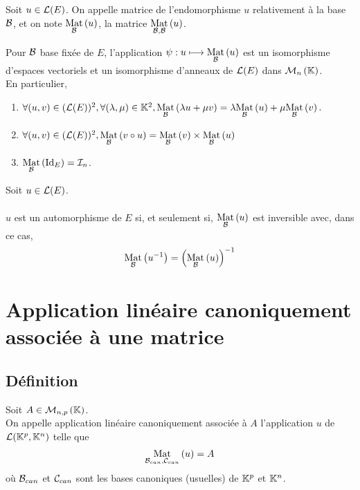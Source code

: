 \begin{defi}
    Soit \(u \in \cal{L}(E)\).
    On appelle matrice de l’endomorphisme \(u\) relativement à la base \(\cal{B}\), et on note \(\Mat{\cal{B}}{u}\), la matrice \(\Mat{\cal{B}, \cal{B}}{u}\).  
\end{defi}

\begin{prop}
    Pour \(\cal{B}\) base fixée de \(E\), l’application \(\psi : u \mapsto \Mat{\cal{B}}{u}\) est un isomorphisme d’espaces vectoriels et un isomorphisme d’anneaux de \(\cal{L}(E)\) dans \(\M{n}\).\\
    En particulier,
    \begin{enumerate}
        \item \(\forall(u, v) \in (\cal{L}(E))^2 , \forall(\lambda, \mu) \in \K^2, \Mat{\cal{B}}{\lambda u + \mu v} = \lambda \Mat{\cal{B}}{u} + \mu \Mat{\cal{B}}{v}.\)
        \item \( \forall(u, v) \in (\cal{L}(E))^2 , \Mat{\cal{B}}{v \circ u} = \Mat{\cal{B}}{v}\times \Mat{\cal{B}}{u} \)
        \item \(\Mat{\cal{B}}{\id{E}} = \cal{I}_n\).
    \end{enumerate}
\end{prop}

\begin{defprop}
    Soit \(u \in \cal{L}(E)\).\\~\\
    \(u\) est un automorphisme de \(E\) si, et seulement si, \(\Mat{\cal{B}}{u}\) est inversible avec, dans ce cas,
    \[\Mat{\cal{B}}{u^{-1}} =\paren{\Mat{\cal{B}}{u}}^{-1}\]
\end{defprop}

\section{Application linéaire canoniquement associée à une matrice}
\subsection{Définition}
\begin{defi}
    Soit \(A \in \M{n,p}\).\\
    On appelle application linéaire canoniquement associée à \(A\) l’application \(u\) de \(\cal{L}(\K^p, \K^n)\) telle que
    \[\Mat{\cal{B}_{can},\cal{C}_{can}}{u}= A\]
    où \(\cal{B}_{can}\) et \(\cal{C}_{can}\) sont les bases canoniques (\ie usuelles) de \(\K^p\) et \(\K^n\).
\end{defi}

